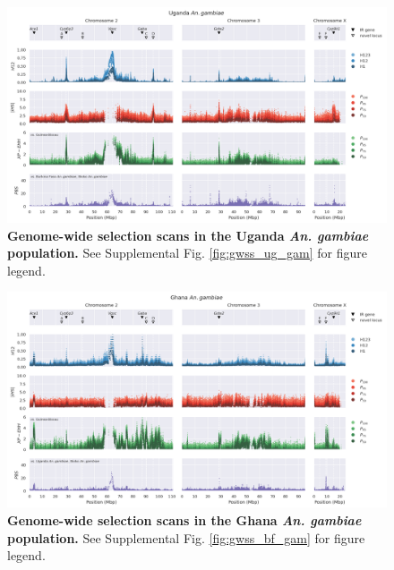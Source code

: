 \documentclass[a4paper,11pt,abstracton,hidelinks]{scrartcl}
\begin{document}
\begin{landscape}
\begin{figure}[t!]
	\begin{center}
		\includegraphics*[width=1\linewidth,center]{artwork/gwss_ug_gam_gw_bf_gam_gq_gam.png}
	\end{center}
	\caption{
	\textbf{Genome-wide selection scans in the Uganda \textit{An. gambiae} population.} 
	See Supplemental Fig. \ref{fig:gwss_ug_gam} for figure legend.
	} 
	\label{fig:gwss_gn_gam}
\end{figure}


\begin{figure}[t!]
	\begin{center}
		\includegraphics*[width=1\linewidth,center]{artwork/gwss_gh_gam_gw_ug_gam_gq_gam.png}
	\end{center}
	\caption{
	\textbf{Genome-wide selection scans in the Ghana \textit{An. gambiae} population.} 
	See Supplemental Fig. \ref{fig:gwss_bf_gam} for figure legend.
	} 
	\label{fig:gwss_gh_gam}
\end{figure}



\end{landscape}
\end{document}
